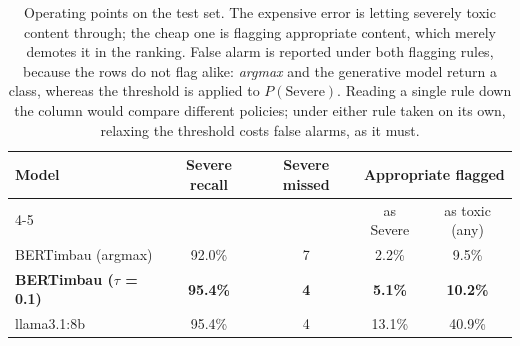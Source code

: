 \begin{table}[!t]
\centering
\caption{Operating points on the test set. The expensive error is letting severely toxic content through; the cheap one is flagging appropriate content, which merely demotes it in the ranking. False alarm is reported under both flagging rules, because the rows do not flag alike: \emph{argmax} and the generative model return a class, whereas the threshold is applied to $P(\text{Severe})$. Reading a single rule down the column would compare different policies; under either rule taken on its own, relaxing the threshold costs false alarms, as it must.}
\label{tab:pontos-operacao}
\begin{tabular}{lcccc}
\toprule
Model & Severe recall & Severe missed & \multicolumn{2}{c}{Appropriate flagged} \\
\cmidrule(lr){4-5}
 & & & as Severe & as toxic (any)  \\
\midrule
BERTimbau (argmax) & 92.0\% & 7 & 2.2\% & 9.5\% \\
\textbf{BERTimbau ($\tau$ = 0.1)} & \textbf{95.4\%} & \textbf{4} & \textbf{5.1\%} & \textbf{10.2\%} \\
llama3.1:8b & 95.4\% & 4 & 13.1\% & 40.9\% \\
\bottomrule
\end{tabular}
\end{table}
